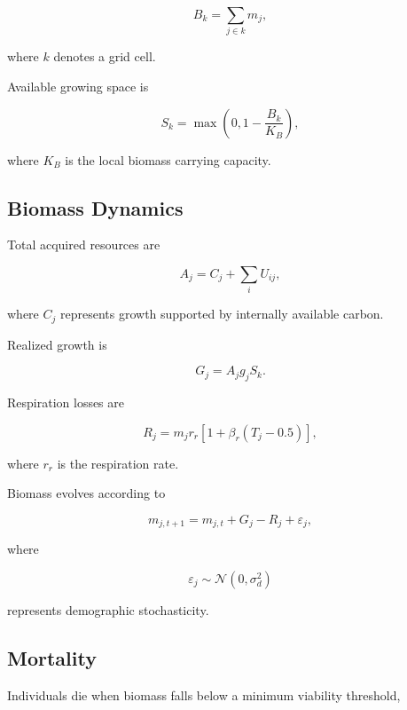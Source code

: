 \begin{equation}
B_k
=
\sum_{j\in k}m_j,
\end{equation}

where $k$ denotes a grid cell.

Available growing space is

\begin{equation}
S_k
=
\max
\left(
0,
1-\frac{B_k}{K_B}
\right),
\end{equation}

where $K_B$ is the local biomass carrying capacity.

\subsection{Biomass Dynamics}

Total acquired resources are

\begin{equation}
A_j
=
C_j
+
\sum_iU_{ij},
\end{equation}

where $C_j$ represents growth supported by internally available carbon.

Realized growth is

\begin{equation}
G_j=A_jg_jS_k.
\end{equation}

Respiration losses are

\begin{equation}
R_j
=
m_jr_r
\left[
1+\beta_r(T_j-0.5)
\right],
\end{equation}

where $r_r$ is the respiration rate.

Biomass evolves according to

\begin{equation}
m_{j,t+1}
=
m_{j,t}
+
G_j
-
R_j
+
\varepsilon_j,
\end{equation}

where

\begin{equation}
\varepsilon_j
\sim
\mathcal N
(0,\sigma_d^2)
\end{equation}

represents demographic stochasticity.

\subsection{Mortality}

Individuals die when biomass falls below a minimum viability threshold,

